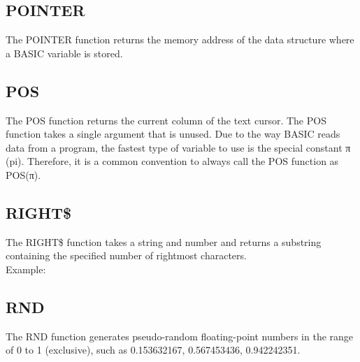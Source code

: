 \subsection{POINTER}

The {\ttfamily POINTER} function returns the memory address of the data
structure where a BASIC variable is stored.\\


\subsection{POS}

The {\ttfamily POS} function returns the current column of the text cursor.
The {\ttfamily POS} function takes a single argument that is unused.  Due to
the way BASIC reads data from a program, the fastest type of variable to use is
the special constant {\ttfamily π} (pi).  Therefore, it is a common convention
to always call the {\ttfamily POS} function as {\ttfamily POS(π)}.\\


\subsection{RIGHT\$}

The {\ttfamily RIGHT\$} function takes a string and number and returns a
substring containing the specified number of rightmost characters.\\

Example:\\


\subsection{RND}

The {\ttfamily RND} function generates pseudo-random floating-point numbers in
the range of 0 to 1 (exclusive), such as 0.153632167, 0.567453436,
0.942242351.\\

